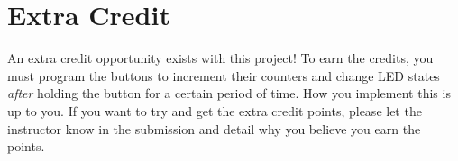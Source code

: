 \section*{Extra Credit}
An extra credit opportunity exists with this project! 
To earn the credits, you must program the buttons to increment their counters and change LED states \emph{after} holding the button for a certain period of time.
How you implement this is up to you.
If you want to try and get the extra credit points, please let the instructor know in the submission and detail why you believe you earn the points.

